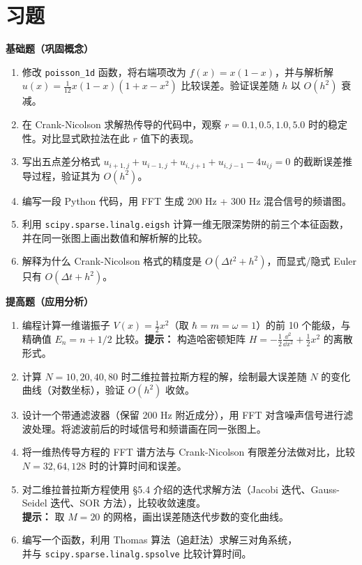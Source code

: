 \section*{习题}

\textbf{基础题（巩固概念）}

\begin{enumerate}
\item 修改 \texttt{poisson\_1d} 函数，将右端项改为 $f(x)=x(1-x)$，并与解析解 $u(x)=\frac{1}{12}x(1-x)(1+x-x^2)$ 比较误差。验证误差随 $h$ 以 $O(h^2)$ 衰减。
\item 在 Crank-Nicolson 求解热传导的代码中，观察 $r=0.1, 0.5, 1.0, 5.0$ 时的稳定性。对比显式欧拉法在此 $r$ 值下的表现。
\item 写出五点差分格式 $u_{i+1,j}+u_{i-1,j}+u_{i,j+1}+u_{i,j-1}-4u_{ij}=0$ 的截断误差推导过程，验证其为 $O(h^2)$。
\item 编写一段 Python 代码，用 FFT 生成 200 Hz + 300 Hz 混合信号的频谱图。
\item 利用 \texttt{scipy.sparse.linalg.eigsh} 计算一维无限深势阱的前三个本征函数，并在同一张图上画出数值和解析解的比较。
\item 解释为什么 Crank-Nicolson 格式的精度是 $O(\Delta t^2 + h^2)$，而显式/隐式 Euler 只有 $O(\Delta t + h^2)$。
\end{enumerate}

\textbf{提高题（应用分析）}

\begin{enumerate}
\item[7.] 编程计算一维谐振子 $V(x)=\frac12 x^2$（取 $\hbar=m=\omega=1$）的前 10 个能级，与精确值 $E_n=n+1/2$ 比较。\textbf{提示：} 构造哈密顿矩阵 $H = -\frac12 \frac{\dd^2}{\dd x^2} + \frac12 x^2$ 的离散形式。
\item[8.] 计算 $N=10,20,40,80$ 时二维拉普拉斯方程的解，绘制最大误差随 $N$ 的变化曲线（对数坐标），验证 $O(h^2)$ 收敛。
\item[9.] 设计一个带通滤波器（保留 200 Hz 附近成分），用 FFT 对含噪声信号进行滤波处理。将滤波前后的时域信号和频谱画在同一张图上。
\item[10.] 将一维热传导方程的 FFT 谱方法与 Crank-Nicolson 有限差分法做对比，比较 $N=32,64,128$ 时的计算时间和误差。
\item[11.] 对二维拉普拉斯方程使用 \S5.4 介绍的迭代求解方法（Jacobi 迭代、Gauss-Seidel 迭代、SOR 方法），比较收敛速度。\\
\textbf{提示：} 取 $M=20$ 的网格，画出误差随迭代步数的变化曲线。
\item[12.] 编写一个函数，利用 Thomas 算法（追赶法）求解三对角系统，\\ 并与 \texttt{scipy.sparse.linalg.spsolve} 比较计算时间。
\end{enumerate}

